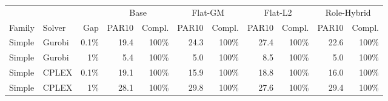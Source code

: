 \begin{tabular}{llrrrrrrrrr}
\toprule
& & & \multicolumn{2}{c}{Base} & \multicolumn{2}{c}{Flat-GM} & \multicolumn{2}{c}{Flat-L2} & \multicolumn{2}{c}{Role-Hybrid} \\
Family & Solver & Gap & PAR10 & Compl. & PAR10 & Compl. & PAR10 & Compl. & PAR10 & Compl. \\
\midrule
Simple & Gurobi & 0.1\% & 19.4 & 100\% & 24.3 & 100\% & 27.4 & 100\% & 22.6 & 100\% \\
Simple & Gurobi & 1\% & 5.4 & 100\% & 5.0 & 100\% & 8.5 & 100\% & 5.0 & 100\% \\
Simple & CPLEX & 0.1\% & 19.1 & 100\% & 15.9 & 100\% & 18.8 & 100\% & 16.0 & 100\% \\
Simple & CPLEX & 1\% & 28.1 & 100\% & 29.8 & 100\% & 27.6 & 100\% & 29.4 & 100\% \\
\bottomrule
\end{tabular}
